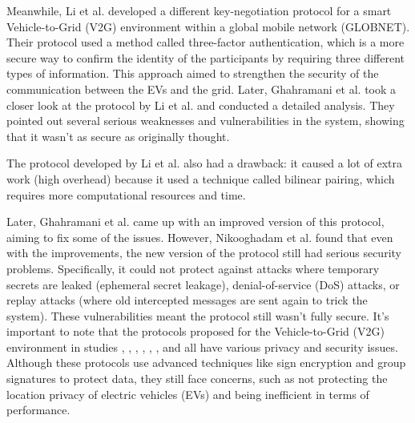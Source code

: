 \documentclass[3p,times,onecolumn]{elsarticle}
\begin{document}
Meanwhile, Li et al. \cite{GT10} developed a different key-negotiation protocol for a smart Vehicle-to-Grid (V2G) environment within a global mobile network (GLOBNET). Their protocol used a method called three-factor authentication, which is a more secure way to confirm the identity of the participants by requiring three different types of information. This approach aimed to strengthen the security of the communication between the EVs and the grid.
Later, Ghahramani et al. \cite{GT13}  took a closer look at the protocol by Li et al. \cite{GT10} and conducted a detailed analysis. They pointed out several serious weaknesses and vulnerabilities in the system, showing that it wasn't as secure as originally thought.

The protocol developed by Li et al. \cite{GT10} also had a drawback: it caused a lot of extra work (high overhead) because it used a technique called bilinear pairing, which requires more computational resources and time.

Later, Ghahramani et al. \cite{GT13} came up with an improved version of this protocol, aiming to fix some of the issues. However, Nikooghadam et al. \cite{GT17} found that even with the improvements, the new version of the protocol still had serious security problems. Specifically, it could not protect against attacks where temporary secrets are leaked (ephemeral secret leakage), denial-of-service (DoS) attacks, or replay attacks (where old intercepted messages are sent again to trick the system). These vulnerabilities meant the protocol still wasn't fully secure.
It's important to note that the protocols proposed for the Vehicle-to-Grid (V2G) environment in studies \cite{GT6}, \cite{GT7}, \cite{GT8} , \cite{GT9}, \cite{GT10}, \cite{GT12}, and \cite{GT13} all have various privacy and security issues. Although these protocols use advanced techniques like sign encryption and group signatures to protect data, they still face concerns, such as not protecting the location privacy of electric vehicles (EVs) and being inefficient in terms of performance.
\end{document}
